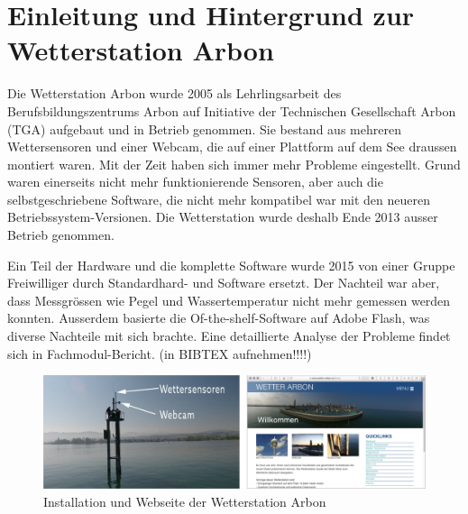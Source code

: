 \section*{Einleitung und Hintergrund zur Wetterstation Arbon}



Die Wetterstation Arbon wurde 2005 als Lehrlingsarbeit des Berufsbildungszentrums Arbon auf Initiative der Technischen Gesellschaft Arbon (TGA) aufgebaut und in Betrieb genommen. Sie bestand aus mehreren Wettersensoren und einer Webcam, die auf einer Plattform auf dem See draussen montiert waren. Mit der Zeit haben sich immer mehr Probleme eingestellt. Grund waren einerseits nicht mehr funktionierende Sensoren, aber auch die selbstgeschriebene Software, die nicht mehr kompatibel war mit den neueren Betriebssystem-Versionen. Die Wetterstation wurde deshalb Ende 2013 ausser Betrieb genommen.

Ein Teil der Hardware und die komplette Software wurde 2015 von einer Gruppe Freiwilliger durch Standardhard- und Software ersetzt. Der Nachteil war aber, dass Messgrössen wie Pegel und Wassertemperatur nicht mehr gemessen werden konnten. Ausserdem basierte die Of-the-shelf-Software auf Adobe Flash, was diverse Nachteile mit sich brachte. Eine detaillierte Analyse der Probleme findet sich in Fachmodul-Bericht. (in BIBTEX aufnehmen!!!!)

\vspace{5mm} %

\begin{figure}[htbp!]
	\centering
	\includegraphics[width=1\linewidth]{img/kombi}
	\caption{Installation und Webseite der Wetterstation Arbon}
	\label{img:wetterstation}
\end{figure}

\vspace{3mm} %

